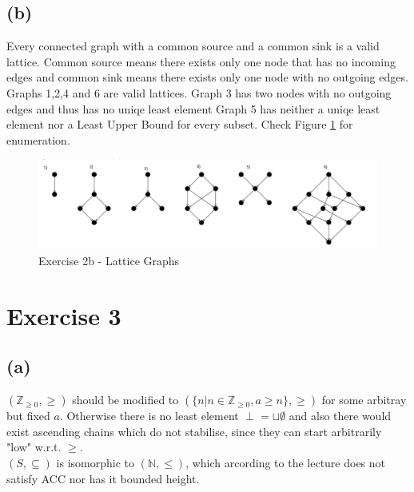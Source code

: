 \documentclass[fleqn,12pt]{article}
\begin{document}
\subsection*{(b)}
Every connected graph with a common source and a common sink is a valid lattice. Common source means there exists only one node that has no incoming edges and common sink means there exists only one node with no outgoing edges. Graphs 1,2,4 and 6 are valid lattices. Graph 3 has two nodes with no outgoing edges and thus has no %
uniqe least element Graph 5 has neither %
a uniqe least element nor a Least Upper Bound for every subset. Check Figure \ref{fig:graphs} for enumeration.

\begin{figure}[!htb]
\includegraphics[width=\textwidth,keepaspectratio]{Graphs.png}
\caption{Exercise 2b - Lattice Graphs}
\label{fig:graphs}
\end{figure}

\section*{Exercise 3}
\subsection*{(a)}
\textbullet $( \mathbb{Z}_{\geq 0},\geq )$ should be modified to $( \{ n | n \in \mathbb{Z}_{\geq 0}, a \geq n \},\geq )$ for some arbitray but fixed $a$.
Otherwise there is no least element $\perp = \sqcup \emptyset$ and also there would exist ascending chains which do not stabilise, since they can start arbitrarily "low" w.r.t. $\geq$.\\
\textbullet $(S,\subseteq)$ is isomorphic to $(\mathbb{N},\leq)$, which arcording to the lecture does not satisfy ACC nor has it bounded height.
\end{document}
